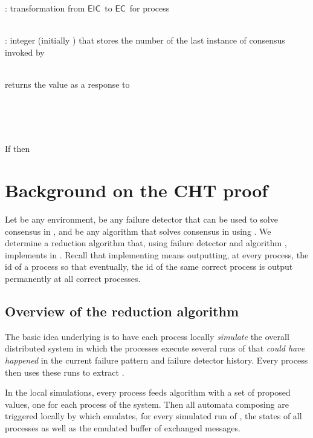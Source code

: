 \documentclass[11pt]{article}
\newcommand{\EC}{\ensuremath{\mathsf{EC}}}
\newcommand{\EIC}{\ensuremath{\mathsf{EIC}}}
\def\fd{failure detector}
\begin{document}
\begin{algorithm}
\caption{: transformation from \EIC~to \EC~for process }\label{algo:EICtoEC}
\small
\begin{description}\itemsep0pt
\item[Internal variables:]~\\
: integer (initially ) that stores the number of the last instance of consensus invoked by 

\item[Functions:]~\\
 returns the value  as a response to 

\item[On invocation of ]~\\
\\


\item[On reception of  as response of ]~\\
If  then\\


\end{description}
\normalsize
\end{algorithm}

\section{Background on the CHT proof}
\label{app:cht}

Let  be any environment,  be any {\fd} that can be used
	to solve consensus in , and  be any algorithm that solves consensus
	in  using .
We  determine a reduction algorithm  that, using failure
	detector  and algorithm ,
	implements  in .
Recall that implementing  means outputting, at every process,
	the id of a process so that eventually,
	the id of the same correct process is output permanently at all correct
	processes.

\subsection{Overview of the reduction algorithm}
\label{subsec:cht:overview}


The basic idea underlying  is to have each process
	locally {\em simulate} the overall distributed system
	in which the processes execute several runs of 
	that \emph{could have happened} in the current failure
	pattern and {\fd} history.
Every process then uses these runs to extract .

In the local simulations, every process  feeds algorithm 
	with a set of proposed values, one for each process of the
	system. Then all automata composing  are triggered
	locally by  which emulates,
	for every simulated run of , the states of all processes as well as
	the emulated buffer of exchanged messages.
\end{document}
